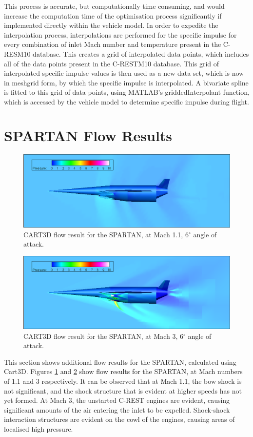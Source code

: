 This process is accurate, but computationally time consuming, and would increase the computation time of the optimisation process significantly if implemented directly within the vehicle model.
 In order to expedite the interpolation process, interpolations are performed for the specific impulse for every combination of inlet Mach number and temperature present in the C-RESM10 database. This creates a grid of interpolated data points, which includes all of the data points present in the C-RESTM10 database. This grid of interpolated specific impulse values is then used as a new data set, which is now in \textsf{meshgrid} form, by which the specific impulse is interpolated. A bivariate spline is fitted to this grid of data points, using MATLAB's \textsf{griddedInterpolant} function, which is accessed by the vehicle model to determine specific impulse during flight.  







\section{SPARTAN Flow Results}
\begin{figure}[ht]
	\centering
	\includegraphics[width=0.9\linewidth]{figures/3_vehicle_design/M1p1AoA6}
	\caption{CART3D flow result for the SPARTAN, at Mach 1.1, 6$^\circ$ angle of attack.}
	\label{fig:M1}
\end{figure}
\begin{figure}[ht]
	\centering
	\includegraphics[width=0.9\linewidth]{figures/3_vehicle_design/M3AoA6}
	\caption{CART3D flow result for the SPARTAN, at Mach 3, 6$^\circ$ angle of attack.}
	\label{fig:M3AoA6}
\end{figure}
This section shows additional flow results for the SPARTAN, calculated using Cart3D.
Figures \ref{fig:M1} and \ref{fig:M3AoA6} show flow results for the SPARTAN, at Mach numbers of 1.1 and 3 respectively. It can be observed that at Mach 1.1, the bow shock is not significant, and the shock structure that is evident at higher speeds has not yet formed. At Mach 3, the unstarted C-REST engines are evident, causing significant amounts of the air entering the inlet to be expelled. Shock-shock interaction structures are evident on the cowl of the engines, causing areas of localised high pressure.


